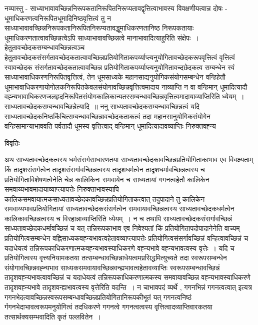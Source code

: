 \documentclass[10pt, openany]{book}
\begin{document}
{नव्यास्तु - साध्याभावावच्छिन्ननिरूपकतानिरूपितनिरूप्यतावद्वृत्तित्वाभावस्य विवक्षणीयत्वान्न दोषः  - धूमाधिकरणत्वनिरूपितधूमादिनिष्ठवृत्तित्वं तु न साध्याभावावच्छिन्ननिरूपकतानिरूपितनिरूप्यतावद्धूमाधिकरणतानिष्ठ निरूपकतायाः धूमाधिकरणतात्वावच्छिन्नत्वेऽपि साध्याभावावच्छिन्नत्वे मानाभावादित्याहुरिति संक्षेपः~।\\

 हेतुतावच्छेदकसम्बन्धावच्छिन्नत्वञ्च  हेतुतावच्छेदकसंसर्गतावच्छेदकतात्वावच्छिन्नप्रतियोगिताकपर्य्याप्त्यनुयोगितावच्छेदकरूपवृत्तित्वं वृत्तित्वं स्वावच्छेदक संसर्गतावच्छेदकतात्वावच्छिन्न  प्रतियोगिताकपर्य्याप्त्यनुयोगितावच्दछेदकत्व  सम्बन्धेन स्वं साध्याभावाधिकरणनिरूपितवृत्तित्वं, तेन धूमसाध्यके महानसाद्यनुयोगिकसंयोगसम्बन्धेन वन्हिहेतौ धूमाभावाधिकरणायोगोलकनिरूपितकेवलसंयोगावच्छिन्नवृत्तित्वमादाय नाव्याप्ति न वा वन्हिमान् धूमादित्यादौ
वह्न्यभावाधिकरणजलहृदनिरूपितसंयोगकालिकान्यतरसम्बन्धावच्छिन्नवृत्तित्वमादायाव्याप्तिरिति ध्येयम्~।\\

साध्यतावच्छेदकसम्बन्धावच्छिन्नेत्यादि~॥ ननु साध्यतावच्छेदकसम्बन्धावच्छिन्नत्वं यदि साध्यतावच्छेदकनिष्ठकिंचित्सम्बन्धावच्छिन्नावच्छेदकताकत्वं तदा महानसानुयोगिकसंयोगेन वन्हिसामान्याभाववति पर्वतादौ धूमस्य वृत्तित्वाद् वन्हिमान् धूमादित्यादावव्याप्तिः निरुक्तवह्न्य
\newpage
\begin{center}     विवृतिः \end{center}
\lfoot{}

अथ साध्यतावच्छेदकत्वस्य धर्मसंसर्गसाधारणतया साध्यतावच्छेदकावच्छिन्नप्रतियोगिताकाभाव एव विवक्ष्यताम् किं तादृशसंसर्गत्वेन तादृशसंसर्गावच्छिन्नत्वस्य तादृशधर्मत्वेन तादृशधर्मावच्छिन्नत्वस्य च प्रतियोगिताविशेषणत्वेनेति चेन्न कालिकिनः समवायेन च साध्यतायां गगनत्वहेतौ कालिकेन समवाय्यभावमादायाव्याप्त्यापत्तेः निरुक्ताभावस्यापि कालिकसमवायात्मकसाध्यतावच्छेदकावच्छिन्नप्रतियोगिताकत्वात् तदुपादाने तु कालिकेन समवाय्यभावप्रतियोगितायां साध्यतावच्छेदकसंसर्गत्वेन समवायावच्छिन्नत्वस्य साध्यतावच्छेदकधर्मत्वेन कालिकावच्छिन्नत्वस्य च विरहान्नाव्याप्तिरिति ध्येयम्~। न च तथापि साध्यतावच्छेदकसंसर्गावच्छिन्नं साध्यतावच्छेदकधर्मावच्छिन्नं च यत् तन्निरूपकाभाव एव निवेश्यतां किं प्रतियोगितापदोपादानेनेति वाच्यम् प्रतियोगित्वसम्बन्धेन वह्निसाध्यकवह्न्यभावत्वहेतावव्याप्त्यापत्तेः प्रतियोगित्वसंसर्गावच्छिन्नं वन्हित्वावच्छिन्नं च यदाधेयत्वं तन्निरूपकाधिकरणात्मकवह्न्यभावस्याधिकरणे वह्न्यभावे वह्न्यभावत्वस्य वृत्तेः~। यदि च प्रतियोगित्वस्य वृत्त्यनियामकतया
तत्सम्बन्धावच्छिन्नाधेयत्वमप्रसिद्धमित्युच्यते तदा स्वरूपसम्बन्धेन संयोगावच्छिन्नवह्न्यभाव साध्यकसमवायावच्छिन्नवन्ह्यभावत्वहेतावव्याप्तिः स्वरूपसम्बन्धावच्छिन्नं
तादृशवह्न्यभावत्वावच्छिन्नं च यदाधेयत्वं तन्निरूपकाधिकरणात्मकस्य समवायावच्छिन्न वह्न्यभावस्याधिकरणे तादृशवह्न्यभावे तादृशवन्ह्यभावत्वस्य वृत्तेरिति वदन्ति~। न चाभावपदं व्यर्थे , गगनभिन्नं गगनत्वत्वात् इत्यत्र गगनभेदत्वावच्छिन्नस्वरूपसम्बन्धावच्छिन्नप्रतियोगितानिरूपकीभूतं यत् गगनत्वनिष्ठं र्गगनभेदाभावत्वरूपमनुयोगित्वं तदधिकरणे गगनत्वे गगनत्वत्वस्य वृत्तित्वादव्याप्तिवारकतया तत्सार्थक्यसम्भवादिति कृतं पल्लवितेन~।\\

}
\end{document}
